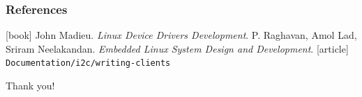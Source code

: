 \documentclass[aspectratio=169,usenames,dvipsnames]{beamer}
\begin{document}
\begin{frame}
  \frametitle{References}
  \begin{thebibliography}{}
  [book]
    John Madieu.
    \newblock \emph{Linux Device Drivers Development}.
    P. Raghavan, Amol Lad, Sriram Neelakandan.
    \newblock \emph{Embedded Linux System Design and Development}.
  [article]
   \texttt{Documentation/i2c/writing-clients}
  \end{thebibliography}
\end{frame}

\begin{frame}[standout]
  Thank you!
\end{frame}

\end{document}
